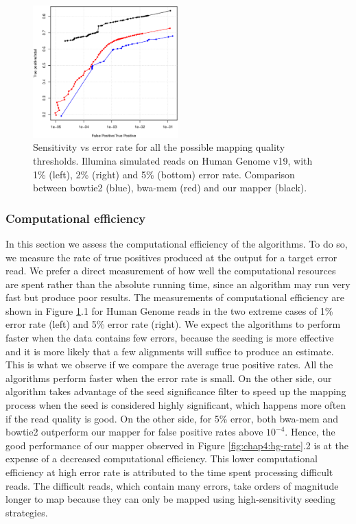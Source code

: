 \begin{figure}[h]
\begin{minipage}[b]{0.5\linewidth}
   \end{minipage}
	\begin{minipage}[b]{\linewidth}
	  \centering
	  \includegraphics[width=0.5\textwidth]{figures/chap4_hg_5_15}
   \end{minipage}
   \label{fig:chap4:hg}
  \caption{Sensitivity vs error rate for all the possible mapping
       quality thresholds. Illumina simulated reads on Human Genome
       v19, with 1\% (left), 2\% (right) and 5\% (bottom) error
       rate. Comparison between bowtie2 (blue), bwa-mem (red) and our
       mapper (black).} 
\end{figure}

\subsubsection{Computational efficiency}

In this section we assess the computational efficiency of the
algorithms. To do so, we measure the rate of true positives produced
at the output for a target error read. We prefer a direct measurement
of how well the computational resources are spent rather than the
absolute running time, since an algorithm may run very fast but
produce poor results. The measurements of computational efficiency are
shown in Figure \ref{fig:chap4:hg}.1 for Human Genome reads in
the two extreme cases of 1\% error rate (left) and 5\% error rate
(right). We expect the algorithms to perform faster when the data
contains few errors, because the seeding is more effective and it is
more likely that a few alignments will suffice to produce an
estimate. This is what we observe if we compare the average true
positive rates. All the algorithms perform faster when the error rate
is small. On the other side, our algorithm takes advantage of the seed
significance filter to speed up the mapping process when the seed is
considered highly significant, which happens more often if the read
quality is good. On the other side, for 5\% error, both bwa-mem and
bowtie2 outperform our mapper for false positive rates above
$10^{-4}$. Hence, the good performance of our mapper observed in
Figure \ref{fig:chap4:hg-rate}.2 is at the expense of a decreased
computational efficiency. This lower computational efficiency at high
error rate is attributed to the time spent processing difficult
reads. The difficult reads, which contain many errors, take orders of
magnitude longer to map because they can only be mapped using
high-sensitivity seeding strategies.

